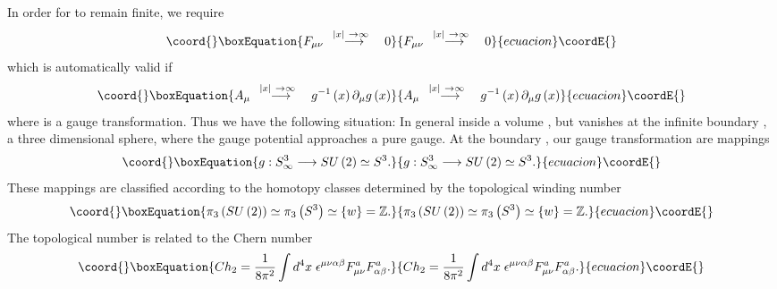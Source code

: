 \documentclass[a4paper,12pt]{book}
\begin{document}
In order for \coordHE{} to remain finite, we require 
\begin{equation}\coord{}\boxEquation{
F_{\mu \nu }\stackrel{\;\;\left| x\right| {\ \rightarrow \infty }\quad }{
\longrightarrow }0
}{
F_{\mu \nu }\stackrel{\;\;\left| x\right| {\ \rightarrow \infty }\quad }{
\longrightarrow }0
}{ecuacion}\coordE{}\end{equation}
which is automatically valid if 
\begin{equation}\coord{}\boxEquation{
A_{\mu }\stackrel{\;\;\left| x\right| {\ \rightarrow \infty }\quad }{
\longrightarrow }g^{-1}\left( x\right) \partial _{\mu }g\left( x\right)
}{
A_{\mu }\stackrel{\;\;\left| x\right| {\ \rightarrow \infty }\quad }{
\longrightarrow }g^{-1}\left( x\right) \partial _{\mu }g\left( x\right)
}{ecuacion}\coordE{}\end{equation}
where \coordHE{} is a gauge transformation.
Thus we have the following situation: In general \coordHE{} inside
a volume \coordHE{}, but vanishes at the infinite boundary \coordHE{}, a three dimensional sphere, where the gauge
potential \coordHE{} approaches a pure gauge. At the boundary \coordHE{}, our gauge transformation \coordHE{}are mappings 
\begin{equation}\coord{}\boxEquation{
g:S_{\infty }^{3}\longrightarrow SU\left( 2\right) \simeq S^{3}.
}{
g:S_{\infty }^{3}\longrightarrow SU\left( 2\right) \simeq S^{3}.
}{ecuacion}\coordE{}\end{equation}
These mappings are classified according to the homotopy classes determined
by the topological winding number \coordHE{} 
\begin{equation}\coord{}\boxEquation{
\pi _{3}\left( SU\left( 2\right) \right) \simeq \pi _{3}\left( S^{3}\right)
\simeq \left\{ w\right\} =\Bbb{Z}.
}{
\pi _{3}\left( SU\left( 2\right) \right) \simeq \pi _{3}\left( S^{3}\right)
\simeq \left\{ w\right\} =\Bbb{Z}.
}{ecuacion}\coordE{}\end{equation}
The topological number \coordHE{} is related to the Chern number 
\begin{equation}\coord{}\boxEquation{
Ch_{2}=\frac{1}{8\pi ^{2}}\int d^{4}x\;\epsilon ^{\mu \nu \alpha \beta
}F_{\mu \nu }^{a}F_{\alpha \beta }^{a}.
}{
Ch_{2}=\frac{1}{8\pi ^{2}}\int d^{4}x\;\epsilon ^{\mu \nu \alpha \beta
}F_{\mu \nu }^{a}F_{\alpha \beta }^{a}.
}{ecuacion}\coordE{}\end{equation}
\end{document}
